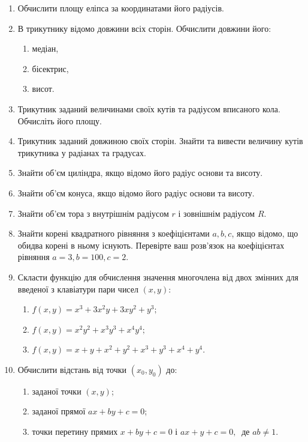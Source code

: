 \documentclass[a5paper,titlepage,openany,twoside,draft]{book_unv}%
\makeatletter
\newcommand{\xslalph}[1]{\expandafter\@xslalph\csname c@#1\endcsname}
\newcommand{\@xslalph}[1]{%
    \ifcase#1\or а\or б\or в\or г\or д\or e\or є\or ж\or з\or i%
    \or й\or к\or л\or м\or н\or о\or п\or р\or с\or т%
    \or у\or ф\or х\or ц\or ч\or ш\or ю\or я\or аа\or бб\or вв%
    \else\@ctrerr\fi%
}
\makeatother
\begin{document}
\begin{enumerate}
\def\labelenumi{\arabic{enumi})}
\setcounter{enumi}{6}
\item
  Обчислити площу еліпса за координатами його радіусів.
\item
  В трикутнику відомо довжини всіх сторін. Обчислити довжини його:
  \begin{enumerate}[label=\xslalph*)]
   \item
    медіан,
   \item
    бісектрис,
    \item
    висот.
  \end{enumerate}
\item
  Трикутник заданий величинами своїх кутів та радіусом вписаного кола.
  Обчисліть його площу.
\item
  Трикутник заданий довжиною своїх сторін. Знайти та вивести величину
  кутів трикутника у радіанах та градусах.
\item
  Знайти об'єм циліндра, якщо відомо його радіус основи та висоту.
\item
  Знайти об'єм конуса, якщо відомо його радіус основи та висоту.
\item
  Знайти об'єм тора з внутрішнім радіусом \(r\) і зовнішнім радіусом
  \(R\).
\item
  Знайти корені квадратного рівняння з коефіцієнтами \(a,b,c\), якщо відомо,
  що обидва корені в ньому існують. Перевірте ваш розв'язок на
  коефіцієнтах рівняння \(a=3,b=100,c=2\).
\item
  Скласти функцію для обчислення значення многочлена від двох змінних
  для введеної з клавіатури пари чисел \((x,y)\):
  \begin{enumerate}[label=\xslalph*)]
    \item
    \(f(x,y) = x^{3} + 3x^{2}y + 3xy^{2} + y^{3};\)
    \item
    \(f(x,y) = x^{2}y^{2} + x^{3}y^{3} + x^{4}y^{4};\)
    \item
    \(f(x,y) = x + y + x^{2} + y^{2} + x^{3} + y^{3} + x^{4} + y^{4}\).
  \end{enumerate}

\item
  Обчислити відстань від точки \((x_{0},y_{0})\) до:
\begin{enumerate}[label=\xslalph*)]
\item заданої точки \((x,y)\);
\item заданої прямої \(ax + by + c = 0\);
\item точки перетину прямих \(x + by + c = 0\) і
\(ax + y + c = 0,\ \) де 
\(ab \neq 1\).
\end{enumerate}


\end{enumerate}
\end{document}
